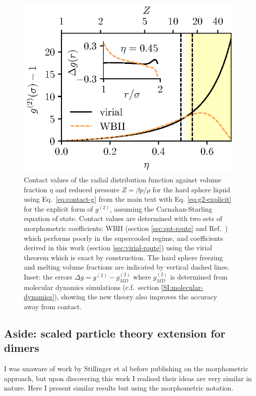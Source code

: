 \documentclass[12pt]{report}
\begin{document}
\begin{figure}
 \includegraphics[width=\linewidth]{g2_contact}
 \caption{
   Contact values of the radial distribution function against volume fraction $\eta$ and reduced pressure $Z = \beta p / \rho$ for the hard sphere liquid using Eq.\ \eqref{eq:contact-g} from the main text with Eq. \eqref{eq:g2-explicit} for the explicit form of $g^{(2)}$, assuming the Carnahan-Starling equation of state.
   Contact values are determined with two sets of morphometric coefficients: WBII (section \ref{sec:spt-route} and Ref.\ \cite{Hansen-Goos2006}) which performs poorly in the supercooled regime, and coefficients derived in this work (section \ref{sec:virial-route}) using the virial theorem which is exact by construction.
   The hard sphere freezing and melting volume fractions are indicated by vertical dashed lines.
   Inset: the errors $\Delta g = g^{(2)} - g^{(2)}_{MD}$ where $g^{(2)}_{MD}$ is determined from molecular dynamics simulations (c.f.\ section \ref{SI:molecular-dynamics}), showing the new theory also improves the accuracy away from contact.
 }
\label{fig:contact-g}
\end{figure}

\subsection{Aside: scaled particle theory extension for dimers}

I was unaware of work by Stillinger et al \cite{Stillinger2006} before publishing on the morphometric approach, but upon discovering this work I realised their ideas are very similar in nature.
Here I present similar results but using the morphometric notation.%
\end{document}

